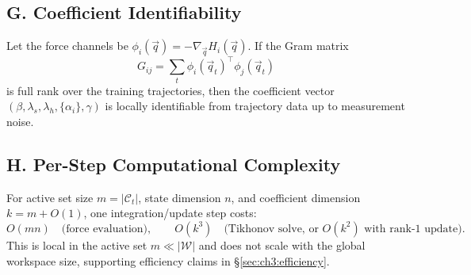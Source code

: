 \subsection*{G. Coefficient Identifiability}

\begin{theorem}
\label{thm:identifiability}
Let the force channels be $\phi_i(\vec{q}) = -\nabla_{\vec{q}} H_i(\vec{q})$.
If the Gram matrix
\[
  G_{ij} = \sum_t \phi_i(\vec{q}_t)^\top \phi_j(\vec{q}_t)
\]
is full rank over the training trajectories, then the coefficient vector
$(\beta, \lambda_s, \lambda_h, \{\alpha_i\}, \gamma)$ is locally
identifiable from trajectory data up to measurement noise.
\end{theorem}

\subsection*{H. Per-Step Computational Complexity}

\begin{proposition}
\label{prop:complexity}
For active set size $m = |\mathcal{C}_t|$, state dimension $n$, and
coefficient dimension $k = m + O(1)$, one integration/update step costs:
\[
  O(mn) \quad \text{(force evaluation)},
  \qquad
  O(k^3) \quad \text{(Tikhonov solve, or } O(k^2) \text{ with rank-1 update)}.
\]
This is local in the active set $m \ll |\mathcal{W}|$ and does not scale
with the global workspace size, supporting efficiency claims in §\ref{sec:ch3:efficiency}.
\end{proposition}

